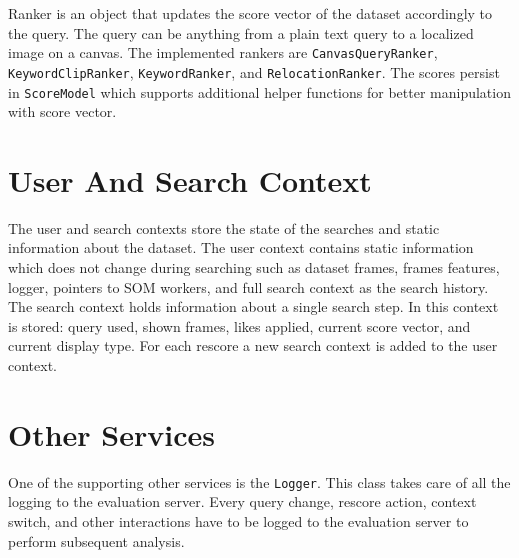 Ranker is an object that updates the score vector of the dataset accordingly to the query. The query can be anything from a plain text query to a localized image on a canvas. The implemented rankers are \lstinline{CanvasQueryRanker}, \lstinline{KeywordClipRanker}, \lstinline{KeywordRanker}, and \lstinline{RelocationRanker}. The scores persist in \lstinline{ScoreModel} which supports additional helper functions for better manipulation with score vector.

\section{User And Search Context}

The user and search contexts store the state of the searches and static information about the dataset. The user context contains static information which does not change during searching such as dataset frames, frames features, logger, pointers to SOM workers, and full search context as the search history. The search context holds information about a single search step. In this context is stored: query used, shown frames, likes applied, current score vector, and current display type. For each rescore a new search context is added to the user context.

\section{Other Services}

One of the supporting other services is the \lstinline{Logger}. This class takes care of all the logging to the evaluation server. Every query change, rescore action, context switch, and other interactions have to be logged to the evaluation server to perform subsequent analysis. 
